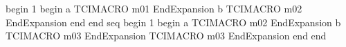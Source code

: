begin
1
begin
a
TCIMACRO
m01
EndExpansion
b
TCIMACRO
m02
EndExpansion
end
end
seq
begin
1
begin
a
TCIMACRO
m02
EndExpansion
b
TCIMACRO
m03
EndExpansion
TCIMACRO
m03
EndExpansion
end
end
